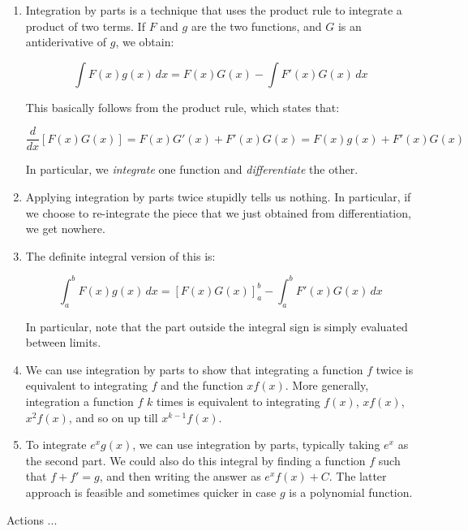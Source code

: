 \documentclass{amsart}
\begin{document}
\begin{enumerate}

\item Integration by parts is a technique that uses the product rule
  to integrate a product of two terms. If $F$ and $g$ are the two
  functions, and $G$ is an antiderivative of $g$, we obtain:

  $$\int F(x) g(x) \, dx = F(x)G(x) - \int F'(x) G(x) \, dx$$

  This basically follows from the product rule, which states that:

  $$\frac{d}{dx} [F(x)G(x)] = F(x)G'(x) + F'(x)G(x) = F(x)g(x) + F'(x)G(x)$$

  In particular, we {\em integrate} one function and {\em
  differentiate} the other.
\item Applying integration by parts twice stupidly tells us
  nothing. In particular, if we choose to re-integrate the piece that
  we just obtained from differentiation, we get nowhere.
\item The definite integral version of this is:

  $$\int_a^b F(x) g(x) \, dx = [F(x)G(x)]_a^b - \int_a^b F'(x) G(x) \, dx$$

  In particular, note that the part outside the integral sign is
  simply evaluated between limits.

\item We can use integration by parts to show that integrating a
  function $f$ twice is equivalent to integrating $f$ and the function
  $xf(x)$. More generally, integration a function $f$ $k$ times is
  equivalent to integrating $f(x)$, $xf(x)$, $x^2f(x)$, and so on up
  till $x^{k-1}f(x)$.
\item To integrate $e^xg(x)$, we can use integration by parts,
  typically taking $e^x$ as the second part. We could also do this
  integral by finding a function $f$ such that $f + f' = g$, and then
  writing the answer as $e^x f(x) + C$. The latter approach is
  feasible and sometimes quicker in case $g$ is a polynomial function.
\end{enumerate}

Actions ...
\end{document}
